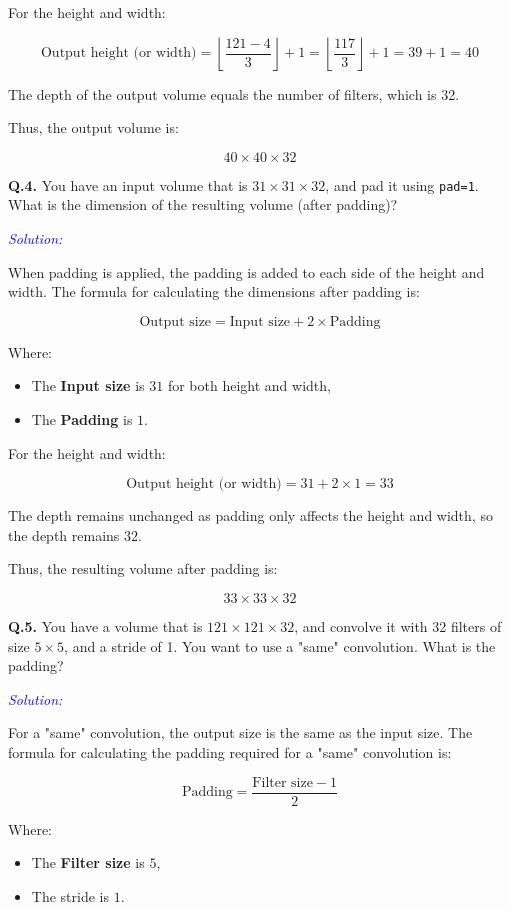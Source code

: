 \documentclass[letterpaper,12pt,notitlepage,twoside]{report}
\begin{document}
For the height and width:

\[
\text{Output height (or width)} = \left\lfloor \frac{121 - 4}{3} \right\rfloor + 1 = \left\lfloor \frac{117}{3} \right\rfloor + 1 = 39 + 1 = 40
\]

The depth of the output volume equals the number of filters, which is 32.

Thus, the output volume is:

\[
40 \times 40 \times 32
\]

\textbf{Q.4.} You have an input volume that is \( 31 \times 31 \times 32 \), and pad it using \texttt{pad=1}. What is the dimension of the resulting volume (after padding)?

\textcolor{blue}{\textit{Solution:}}

When padding is applied, the padding is added to each side of the height and width. The formula for calculating the dimensions after padding is:

\[
\text{Output size} = \text{Input size} + 2 \times \text{Padding}
\]

Where:
\begin{itemize}
    \item The \textbf{Input size} is \( 31 \) for both height and width,
    \item The \textbf{Padding} is \( 1 \).
\end{itemize}

For the height and width:

\[
\text{Output height (or width)} = 31 + 2 \times 1 = 33
\]

The depth remains unchanged as padding only affects the height and width, so the depth remains \( 32 \).

Thus, the resulting volume after padding is:

\[
33 \times 33 \times 32
\]

\textbf{Q.5.} You have a volume that is \( 121 \times 121 \times 32 \), and convolve it with 32 filters of size \( 5 \times 5 \), and a stride of 1. You want to use a "same" convolution. What is the padding?

\textcolor{blue}{\textit{Solution:}}

For a "same" convolution, the output size is the same as the input size. The formula for calculating the padding required for a "same" convolution is:

\[
\text{Padding} = \frac{\text{Filter size} - 1}{2}
\]

Where:
\begin{itemize}
    \item The \textbf{Filter size} is \( 5 \),
    \item The stride is \( 1 \).
\end{itemize}
\end{document}
